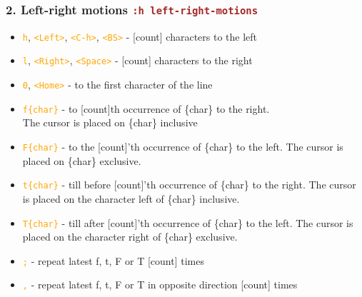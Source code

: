 \documentclass{beamer}
\newcommand{\vimcommand}[1]{\texttt{\textcolor{brown}{#1}}}
\newcommand{\vimmotion}[1]{\texttt{\textcolor{orange}{#1}}}
\newcommand{\vimhelp}[1]{\vimcommand{:h #1}}
\newcommand{\vimkey}[1]{\textless{}#1\textgreater{}}
\begin{document}
\begin{frame}
    \frametitle{2. Left-right motions \vimhelp{left-right-motions}}
    \begin{itemize}
        \item \vimmotion{h}, \vimmotion{\vimkey{Left}}, \vimmotion{\vimkey{C-h}}, \vimmotion{\vimkey{BS}} - [count] characters to the left
        \item \vimmotion{l}, \vimmotion{\vimkey{Right}}, \vimmotion{\textless{}Space\textgreater{}} - [count] characters to the right
        \item \vimmotion{0}, \vimmotion{\textless{}Home\textgreater{}} - to the first character of the line
        \item \vimmotion{f\{char\}} - to [count]th occurrence of \{char\} to the right.\\ The cursor is placed on \{char\} inclusive
        \item \vimmotion{F\{char\}} - to the [count]'th occurrence of \{char\} to the left. The cursor is placed on \{char\} exclusive.
        \item \vimmotion{t\{char\}} - till before [count]'th occurrence of \{char\} to the right. The cursor is placed on the character left of \{char\} inclusive.
        \item \vimmotion{T\{char\}} - till after [count]'th occurrence of \{char\} to the left. The cursor is placed on the character right of \{char\} exclusive.
        \item \vimmotion{;} - repeat latest f, t, F or T [count] times
        \item \vimmotion{,} - repeat latest f, t, F or T in opposite direction [count] times
    \end{itemize}
\end{frame}
\end{document}
